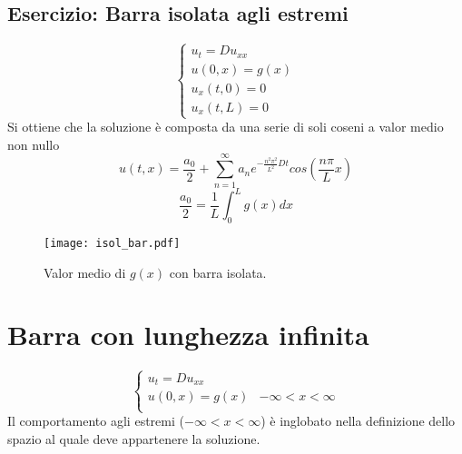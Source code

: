 \subsection{Esercizio: Barra isolata agli estremi}
\[
	\left\{
	\begin{array}{l}
		u_t=Du_{xx} \\
		u(0,x)=g(x) \\
		u_x(t,0)=0 \\
		u_x(t,L)=0
	\end{array}
	\right.
\]
Si ottiene che la soluzione \`e composta da una serie di soli coseni a
valor medio non nullo
\[
	u(t,x)= \frac{a_0}{2}+ \sum_{n=1}^\infty a_n
	e^{-\frac{n^2\pi^2}{L^2} Dt}
	cos \left(\frac{n\pi}{L}x \right)
\]
\[
	\frac{a_0}{2}= \frac{1}{L}\int_0^L g(x)dx
\]
\begin{figure}[H]
	\centering
	\texttt{[image: isol\_bar.pdf]}
	\caption{Valor medio di $g(x)$ con barra isolata.}
	\label{isol_bar}
\end{figure}
\section{Barra con lunghezza infinita}
\[
	\left\{
	\begin{array}{ll}
		u_t=Du_{xx} \\
		u(0,x)=g(x) & -\infty < x < \infty \\
	\end{array}
	\right.
\]
Il comportamento agli estremi ($-\infty < x < \infty$) \`e inglobato nella
definizione dello spazio al quale deve appartenere la soluzione.
